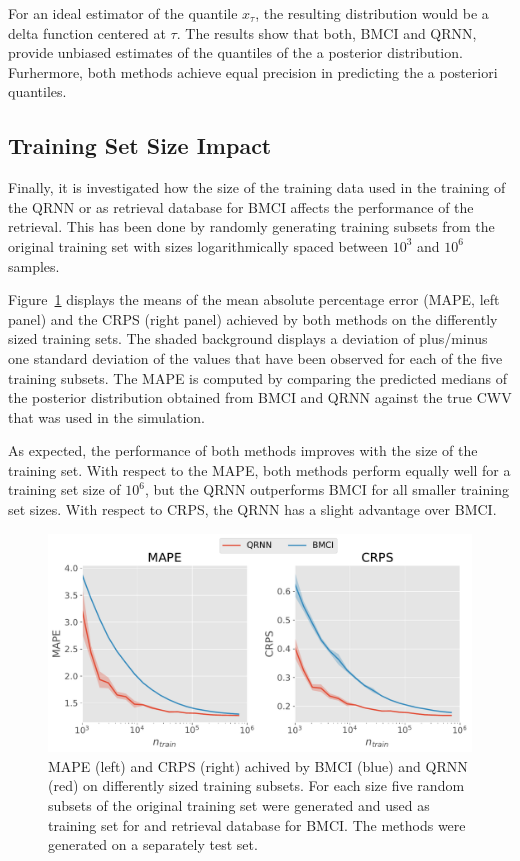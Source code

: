 \documentclass[journal abbreviation, manuscript]{copernicus}
\begin{document}
  For an ideal estimator of the quantile $x_\tau$, the resulting distribution
  would be a delta function centered at $\tau$. The results show that both, BMCI
  and QRNN, provide unbiased estimates of the quantiles of the a posterior
  distribution. Furhermore, both methods achieve equal precision in predicting
  the a posteriori quantiles.

\subsection{Training Set Size Impact}

Finally, it is investigated how the size of the training data used in the training of the
QRNN or as retrieval database for BMCI affects the performance of the retrieval. This has
been done by randomly generating training subsets from the original training set with sizes
logarithmically spaced between $10^3$ and $10^6$ samples.

Figure~\ref{fig:mape_crps} displays the means of the mean absolute percentage error
(MAPE, left panel) and the CRPS (right panel) achieved by both methods on the differently
sized training sets. The shaded background displays a deviation of plus/minus one standard
deviation of the values that have been observed for each of the five training subsets.
The MAPE is computed by comparing the predicted medians of the posterior distribution
obtained from BMCI and QRNN against the true CWV that was used in the simulation.

As expected, the performance of both methods improves with the size of the
training set. With respect to the MAPE, both methods perform equally well for a
training set size of $10^6$, but the QRNN outperforms BMCI for all smaller
training set sizes. With respect to CRPS, the QRNN has a slight advantage
over BMCI.

  \begin{figure}[hbpt!]
    \centering
    \includegraphics[width = 0.8\linewidth]{../plots/mape_crps}
    \caption{MAPE (left) and CRPS (right) achived by BMCI (blue) and QRNN (red) on differently
      sized training subsets. For each size five random subsets of the original training set
      were generated and used as training set for and retrieval database for BMCI. The methods
      were generated on a separately test set.}
    \label{fig:mape_crps}
  \end{figure}
\end{document}
